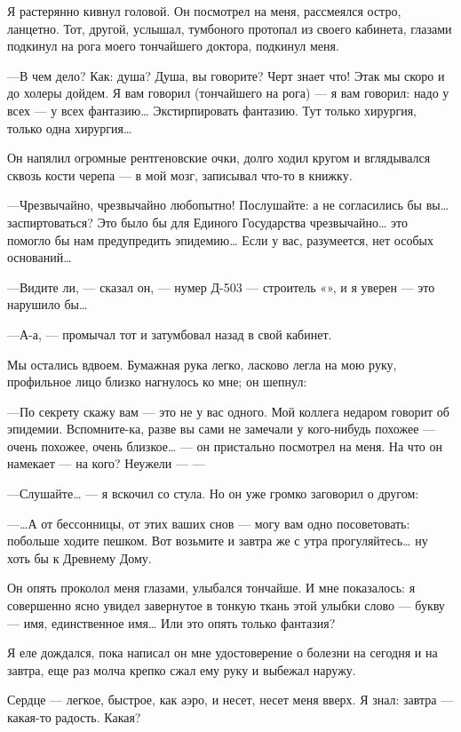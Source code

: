 \documentclass[11pt,openany]{book}
\begin{document}
Я растерянно кивнул головой. Он посмотрел на меня, рассмеялся остро, ланцетно. Тот, другой, услышал, тумбоного протопал из своего кабинета, глазами подкинул на рога моего тончайшего доктора, подкинул меня.

---В чем дело? Как: душа? Душа, вы говорите? Черт знает что! Этак мы скоро и до холеры дойдем. Я вам говорил (тончайшего на рога) --- я вам говорил: надо у всех --- у всех фантазию\ldots{} Экстирпировать фантазию. Тут только хирургия, только одна хирургия\ldots{}

Он напялил огромные рентгеновские очки, долго ходил кругом и вглядывался сквозь кости черепа --- в мой мозг, записывал что-то в книжку.

---Чрезвычайно, чрезвычайно любопытно! Послушайте: а не согласились бы вы\ldots{} заспиртоваться? Это было бы для Единого Государства чрезвычайно\ldots{} это помогло бы нам предупредить эпидемию\ldots{} Если у вас, разумеется, нет особых оснований\ldots{}

---Видите ли, --- сказал он, --- нумер Д-503 --- строитель «», и я уверен --- это нарушило бы\ldots{}

---А-а, --- промычал тот и затумбовал назад в свой кабинет.

Мы остались вдвоем. Бумажная рука легко, ласково легла на мою руку, профильное лицо близко нагнулось ко мне; он шепнул:

---По секрету скажу вам --- это не у вас одного. Мой коллега недаром говорит об эпидемии. Вспомните-ка, разве вы сами не замечали у кого-нибудь похожее --- очень похожее, очень близкое\ldots{} --- он пристально посмотрел на меня. На что он намекает --- на кого? Неужели --- ---

---Слушайте\ldots{} --- я вскочил со стула. Но он уже громко заговорил о другом:

---\ldots{}А от бессонницы, от этих ваших снов --- могу вам одно посоветовать: побольше ходите пешком. Вот возьмите и завтра же с утра прогуляйтесь\ldots{} ну хоть бы к Древнему Дому.

Он опять проколол меня глазами, улыбался тончайше. И мне показалось: я совершенно ясно увидел завернутое в тонкую ткань этой улыбки слово --- букву --- имя, единственное имя\ldots{} Или это опять только фантазия?

Я еле дождался, пока написал он мне удостоверение о болезни на сегодня и на завтра, еще раз молча крепко сжал ему руку и выбежал наружу.

Сердце --- легкое, быстрое, как аэро, и несет, несет меня вверх. Я знал: завтра --- какая-то радость. Какая?
\end{document}
